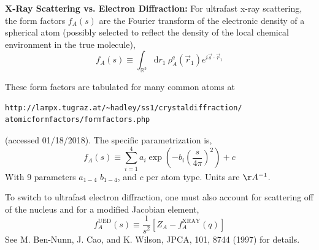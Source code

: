 \documentclass[fleqn,oneside,12pt]{article}
\begin{document}
\textbf{X-Ray Scattering vs. Electron Diffraction:} For ultrafast x-ray
scattering, the form factors $f_{A} (s)$ are the Fourier transform of the
electronic density of a spherical atom (possibly selected to reflect the density
of the local chemical environment in the true molecule),
\[
f_{A} (s)
\equiv
\int_{\mathbb{R}^3}
\mathrm{d} r_1
\
\rho_{A}^{\mathrm{e}} (\vec r_{1})
e^{i \vec s \cdot \vec r_1}
\]

These form factors are tabulated for many common atoms at
\begin{verbatim}
http://lampx.tugraz.at/~hadley/ss1/crystaldiffraction/
atomicformfactors/formfactors.php
\end{verbatim}
(accessed 01/18/2018). The specific parametrization is,
\[
f_{A} (s)
\equiv
\sum_{i=1}^{4}
a_{i}
\exp
\left (
-b_{i}
\left (
\frac{s}{4\pi}
\right )^2
\right )
+
c
\]
With 9 parameters $a_{1-4}$ $b_{1-4}$, and $c$ per atom type. Units are
$\AA{}^{-1}$.

To switch to ultrafast electron diffraction, one must also account for
scattering off of the nucleus and for a modified Jacobian element,
\[
f_{A}^{\mathrm{UED}}
(s)
\equiv
\frac{1}{s^2}
\left [
Z_{A}
-
f_{A}^{\mathrm{XRAY}}
(q)
\right ]
\]
See M. Ben-Nunn, J. Cao, and K. Wilson, JPCA, 101, 8744 (1997) for details.
\end{document}
